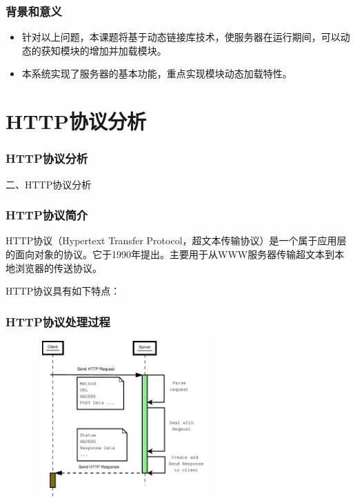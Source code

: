 \documentclass[10pt,dvipdfm]{beamer}
\begin{document}
\begin{frame}
	\frametitle{背景和意义}
	\begin{block}{}
	\begin{itemize}
		\item 针对以上问题，本课题将基于动态链接库技术，使服务器在运行期间，可以动态的获知模块的增加并加载模块。
		\item 本系统实现了服务器的基本功能，重点实现模块动态加载特性。
	\end{itemize}
	\end{block}
\end{frame}

\section{HTTP协议分析}

\begin{frame}
	\frametitle{HTTP协议分析}
	\begin{center}
	{\Large
		二、HTTP协议分析
	}
	\end{center}
\end{frame}

\begin{frame}
	\frametitle{HTTP协议简介}
	
HTTP协议（Hypertext Transfer Protocol，超文本传输协议）是一个属于应用层的面向对象的协议。它于1990年提出。主要用于从WWW服务器传输超文本到本地浏览器的传送协议。

 	\pause

\begin{block}{HTTP协议具有如下特点：}
\end{block}
\end{frame}

\begin{frame}
	\frametitle{HTTP协议处理过程}
	\begin{figure}[htbp]
	\centering
	\includegraphics[height=6cm, width=7cm]{pics/serverhttp.eps}
	\end{figure}
\end{frame}
\end{document}
